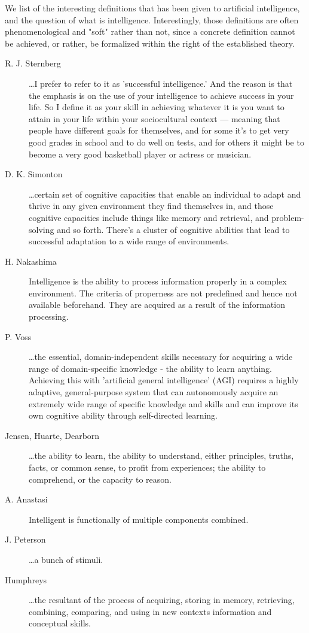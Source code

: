 We list of the interesting definitions that has been given to artificial intelligence, and the question of what is intelligence. Interestingly, those definitions are often phenomenological and "soft" rather than not, since a concrete definition cannot be achieved, or rather, be formalized within the right of the established theory. 
\begin{description}
    \item[R. J. Sternberg] \dots I prefer to refer to it as 'successful intelligence.' And the reason is that the emphasis is on the use of your intelligence to achieve success in your life. So I define it as your skill in achieving whatever it is you want to attain in your life within your sociocultural context — meaning that people have different goals for themselves, and for some it's to get very good grades in school and to do well on tests, and for others it might be to become a very good basketball player or actress or musician. 
    \item[D. K. Simonton] \dots certain set of cognitive capacities that enable an individual to adapt and thrive in any given environment they find themselves in, and those cognitive capacities include things like memory and retrieval, and problem-solving and so forth. There's a cluster of cognitive abilities that lead to successful adaptation to a wide range of environments.
    \item[H. Nakashima] Intelligence is the ability to process information properly in a complex environment. The criteria of properness are not predefined and hence not available beforehand. They are acquired as a result of the information processing.
    \item[P. Voss] \dots the essential, domain-independent skills necessary for acquiring a wide range of domain-specific knowledge - the ability to learn anything. Achieving this with 'artificial general intelligence' (AGI) requires a highly adaptive, general-purpose system that can autonomously acquire an extremely wide range of specific knowledge and skills and can improve its own cognitive ability through self-directed learning. 
    \item[Jensen, Huarte, Dearborn] \dots the ability to learn, the ability to understand, either principles, truths, facts, or common sense, to profit from experiences; the ability to comprehend, or the capacity to reason.
    \item[A. Anastasi] Intelligent is functionally of multiple components combined.
    \item[J. Peterson] \dots a bunch of stimuli. 
    \item[Humphreys] \dots the resultant of the process of acquiring, storing in memory, retrieving, combining, comparing, and using in new contexts information and conceptual skills.
\end{description}

